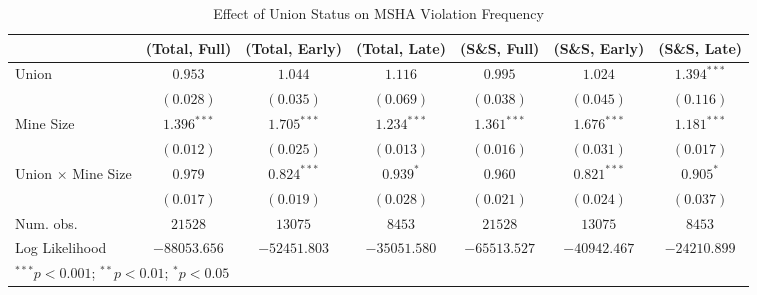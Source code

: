 
\begin{table}[H]
\begin{center}
\begin{tabular}{l c c c c c c}
\hline
 & (Total, Full) & (Total, Early) & (Total, Late) & (S\&S, Full) & (S\&S, Early) & (S\&S, Late) \\
\hline
Union                      & $0.953$       & $1.044$       & $1.116$       & $0.995$       & $1.024$       & $1.394^{***}$ \\
                           & $(0.028)$     & $(0.035)$     & $(0.069)$     & $(0.038)$     & $(0.045)$     & $(0.116)$     \\
Mine Size                  & $1.396^{***}$ & $1.705^{***}$ & $1.234^{***}$ & $1.361^{***}$ & $1.676^{***}$ & $1.181^{***}$ \\
                           & $(0.012)$     & $(0.025)$     & $(0.013)$     & $(0.016)$     & $(0.031)$     & $(0.017)$     \\
Union $ \times $ Mine Size & $0.979$       & $0.824^{***}$ & $0.939^{*}$   & $0.960$       & $0.821^{***}$ & $0.905^{*}$   \\
                           & $(0.017)$     & $(0.019)$     & $(0.028)$     & $(0.021)$     & $(0.024)$     & $(0.037)$     \\
\hline
Num. obs.                  & $21528$       & $13075$       & $8453$        & $21528$       & $13075$       & $8453$        \\
Log Likelihood             & $-88053.656$  & $-52451.803$  & $-35051.580$  & $-65513.527$  & $-40942.467$  & $-24210.899$  \\
\hline
\multicolumn{7}{l}{\scriptsize{$^{***}p<0.001$; $^{**}p<0.01$; $^{*}p<0.05$}}
\end{tabular}
\caption{Effect of Union Status on MSHA Violation Frequency}
\label{irr_100employees_violations}
\end{center}
\end{table}

